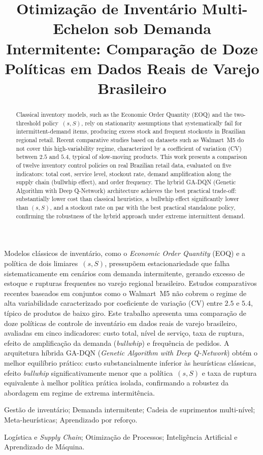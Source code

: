 \documentclass[a4paper,11pt]{article}
\title{Otimização de Inventário Multi-Echelon sob Demanda Intermitente: Comparação de Doze Políticas em Dados Reais de Varejo Brasileiro}
\author{
\name{}
\institute{Filiação}
\iaddress{Endereço da Instituição}
\email{e-mail}
}
\author{
\name{Segundo Autor}
\institute{Filiação}
\iaddress{Endereço da Instituição}
\email{e-mail}
}
\begin{document}
\maketitle

\vspace{8mm}
\begin{resumo}
Modelos clássicos de inventário, como o \textit{Economic Order Quantity}
(EOQ) e a política de dois limiares~$(s,S)$, pressupõem
estacionariedade que falha sistematicamente em cenários com demanda
intermitente, gerando excesso de estoque e rupturas frequentes no
varejo regional brasileiro. Estudos comparativos recentes baseados em
conjuntos como o Walmart~M5 não cobrem o regime de alta variabilidade
caracterizado por coeficiente de variação (CV) entre $2.5$ e $5.4$,
típico de produtos de baixo giro. Este trabalho apresenta uma
comparação de doze políticas de controle de inventário em dados reais
de varejo brasileiro, avaliadas em cinco indicadores: custo total,
nível de serviço, taxa de ruptura, efeito de amplificação da demanda
(\textit{bullwhip}) e frequência de pedidos.
A arquitetura híbrida GA-DQN (\textit{Genetic Algorithm with Deep Q-Network}) obtém o melhor equilíbrio prático: custo
substancialmente inferior às heurísticas clássicas, efeito
\textit{bullwhip} significativamente menor que a política~$(s,S)$ e
taxa de ruptura equivalente à melhor política prática isolada,
confirmando a robustez da abordagem em regime de extrema intermitência.
\end{resumo}


\bigskip
\begin{palchaves}
Gestão de inventário; Demanda intermitente; Cadeia de suprimentos
multi-nível; Meta-heurísticas; Aprendizado por reforço.

\bigskip
{}
Logística e \textit{Supply Chain}; Otimização de Processos;
Inteligência Artificial e Aprendizado de Máquina.
\end{palchaves}

\vspace{8mm}
\begin{abstract}
Classical inventory models, such as the Economic Order Quantity (EOQ)
and the two-threshold policy~$(s,S)$, rely on stationarity assumptions
that systematically fail for intermittent-demand items, producing
excess stock and frequent stockouts in Brazilian regional retail.
Recent comparative studies based on datasets such as Walmart~M5 do
not cover this high-variability regime, characterized by a coefficient
of variation (CV) between $2.5$ and $5.4$, typical of slow-moving
products. This work presents a comparison of twelve inventory
control policies on real Brazilian retail data, evaluated on five
indicators: total cost, service level, stockout rate, demand
amplification along the supply chain (bullwhip effect), and order
frequency. The hybrid GA-DQN (Genetic Algorithm with Deep Q-Network)
architecture achieves the best practical trade-off: substantially
lower cost than classical heuristics, a bullwhip effect significantly
lower than $(s,S)$, and a stockout rate on par with the best practical
standalone policy, confirming the robustness of the hybrid approach
under extreme intermittent demand.
\end{abstract}
\end{document}
